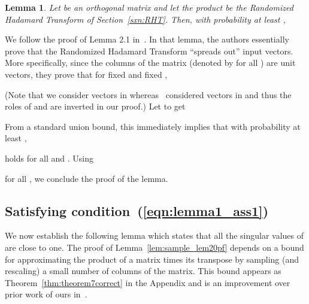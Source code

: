 \documentclass[11pt]{article}
\newtheorem{lemma}{Lemma}
\newenvironment{Proof}{\noindent {\em Proof:}}{\\\hspace*{\fill}\mbox{}}
\begin{document}
\begin{lemma} \label{lem:HU}
Let  be an  orthogonal matrix and let the product  be the  Randomized Hadamard Transform of Section~\ref{sxn:RHT}. Then, with probability at least ,



\end{lemma}
\begin{Proof}
We follow the proof of Lemma 2.1 in~\cite{AC06}. In that lemma, the authors essentially prove that the Randomized Hadamard Transform  ``spreads out'' input vectors. More specifically, since the columns of the matrix  (denoted by  for all ) are unit vectors, they prove that for fixed  and fixed ,

(Note that we consider  vectors in  whereas~\cite{AC06} considered  vectors in  and thus the roles of  and  are inverted in our proof.) Let  to get

From a standard union bound, this immediately implies that with probability at least ,

holds for all  and  . Using

for all , we conclude the proof of the lemma.
\end{Proof}

\subsection{Satisfying condition~(\ref{eqn:lemma1_ass1})}

We now establish the following lemma which states that all the singular values of  are close to one. The proof of Lemma~\ref{lem:sample_lem20pf} depends on a bound for approximating the product of a matrix times its transpose by sampling (and rescaling) a small number of columns of the matrix. This bound appears as Theorem~\ref{thm:theorem7correct} in the Appendix and is an improvement over prior work of ours in~\cite{DMM08_CURtheory_JRNL}.
\end{document}
